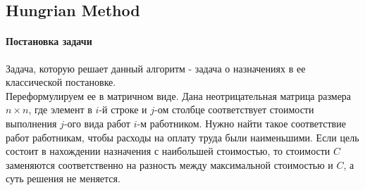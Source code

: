 \subsection{Hungrian Method}
\paragraph{Постановка задачи}
Задача, которую решает данный алгоритм - задача о назначениях в ее классической постановке.\\
Переформулируем ее в матричном виде. Дана неотрицательная матрица размера $n × n$, где элемент в $i$-й строке и $j$-ом столбце соответствует стоимости выполнения $j$-ого вида работ $i$-м работником. Нужно 
найти такое соответствие работ работникам, чтобы расходы на оплату труда были наименьшими. Если цель состоит в нахождении назначения с наибольшей стоимостью, то стоимости $C$ заменяются соответственно на разность 
между максимальной стоимостью и $C$, а суть решения не меняется.\\
